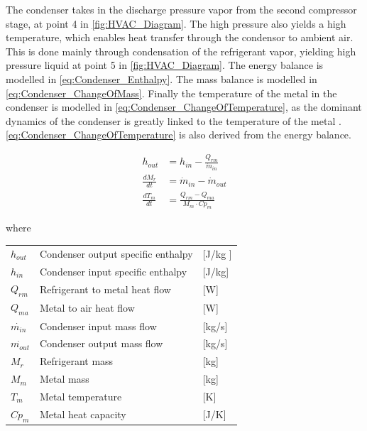 The condenser takes in the discharge pressure vapor from the second compressor stage, at point 4 in \cref{fig:HVAC_Diagram}. The high pressure also yields a high temperature,
which enables heat transfer through the condensor to ambient air. This is done mainly through condensation of the refrigerant vapor, yielding high pressure liquid at point 5 in \cref{fig:HVAC_Diagram}.
The energy balance is modelled in \cref{eq:Condenser_Enthalpy}. The mass balance is modelled in \cref{eq:Condenser_ChangeOfMass}. Finally the temperature of the metal in the condenser is modelled in
\cref{eq:Condenser_ChangeOfTemperature}, as the dominant dynamics of the condenser is greatly linked to the temperature of the metal \cite{Sorensen2013}. \cref{eq:Condenser_ChangeOfTemperature} is also
derived from the energy balance.

\begin{align}
	h_{out} 			& = h_{in} - \frac{Q_{rm}}{\dot{m}_{in}}  	\label{eq:Condenser_Enthalpy} \\
	\frac{dM_r}{dt} 	& = \dot{m}_{in} - \dot{m}_{out} 				\label{eq:Condenser_ChangeOfMass}\\
	\frac{dT_m}{dt} 	& = \frac{Q_{rm} - Q_{ma}}{M_m \cdot Cp_m}		\label{eq:Condenser_ChangeOfTemperature}
\end{align}

where

\begin{center}
	\begin{tabular}{l p{8cm} l}
		$h_{out}$				&  Condenser output specific enthalpy			& [\si{J}/\si{kg} ]\\
		$h_{in}$					&  Condenser input specific enthalpy 			& [\si{J}/\si{kg}] \\
		$Q_{rm}$					& Refrigerant to metal heat flow 			& [\si{W}] \\
		$Q_{ma}$					& Metal to air heat flow						& [\si{W}] \\
		$\dot{m_{in}}$			& Condenser input mass flow 			& [\si{kg}/\si{s}] \\
		$\dot{m_{out}}$			& Condenser output mass flow 		& [\si{kg}/\si{s}] \\
		$M_r$						& Refrigerant mass 								& [\si{kg}] \\
		$M_m$						& Metal mass												& [\si{kg}] \\
		$T_m$						& Metal temperature 							& [\si{K}]\\
		$Cp_m$					& Metal heat capacity 						& [\si{J}/\si{K}]\\
	\end{tabular}
\end{center}

